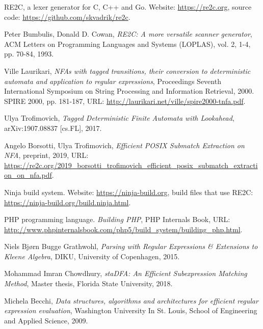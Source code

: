 \documentclass[preprint,12pt, a4paper]{elsarticle}
\begin{document}
\begin{thebibliography}{00}

    RE2C, a lexer generator for C, C++ and Go.
    Website: \url{https://re2c.org},
    source code: \url{https://github.com/skvadrik/re2c}.

    Peter Bumbulis,
    Donald D. Cowan,
    \textit{RE2C: A more versatile scanner generator},
    ACM Letters on Programming Languages and Systems (LOPLAS),
    vol. 2, 1-4,
    pp. 70-84,
    1993.

    Ville Laurikari,
    \textit{NFAs with tagged transitions, their conversion to deterministic automata and application to regular expressions},
    Proceedings Seventh International Symposium on String Processing and Information Retrieval, 2000. SPIRE 2000,
    pp. 181-187,
    URL: \url{http://laurikari.net/ville/spire2000-tnfa.pdf}.

    Ulya Trofimovich,
    \textit{Tagged Deterministic Finite Automata with Lookahead},
    arXiv:1907.08837 [cs.FL],
    2017.

    Angelo Borsotti, Ulya Trofimovich,
    \textit{Efficient POSIX Submatch Extraction on NFA},
    preprint, 2019,
    URL: \url{https://re2c.org/2019_borsotti_trofimovich_efficient_posix_submatch_extraction_on_nfa.pdf}.

    Ninja build system.
    Website: \url{https://ninja-build.org},
    build files that use RE2C: \url{https://ninja-build.org/build.ninja.html}.

    PHP programming language.
    \textit{Building PHP},
    PHP Internals Book,
    URL: \url{http://www.phpinternalsbook.com/php5/build_system/building_php.html}.

    Niels Bj{\o}rn Bugge Grathwohl,
    \textit{Parsing with Regular Expressions \& Extensions to Kleene Algebra},
    DIKU, University of Copenhagen,
    2015.

    Mohammad Imran Chowdhury,
    \textit{staDFA: An Efficient Subexpression Matching Method},
    Master thesis,
    Florida State University,
    2018.

    Michela Becchi,
    \textit{Data structures, algorithms and architectures for efficient regular expression evaluation},
    Washington University In St. Louis, School of Engineering and Applied Science,
    2009.

\end{thebibliography}
\end{document}
